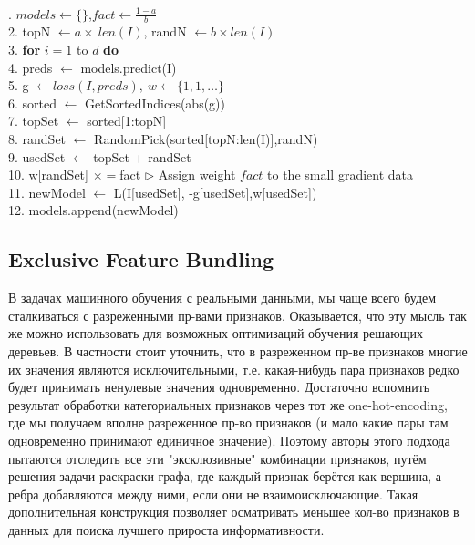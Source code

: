 \documentclass[12pt,fleqn]{article}
\begin{document}
\hline\\ \vspace{10pt}
{\ttfamily
	. $models \leftarrow \{\}$,$fact \leftarrow \frac{1 - a}{b}$\\
	2. topN $\leftarrow a \times~len(I)$, randN $\leftarrow b \times len(I)$\\
	3. \textbf{for} $i = 1$ to $d$ \textbf{do}\\
	4. \hspace{15pt} preds $\leftarrow$ models.predict(I)\\
	5. \hspace{15pt} g $\leftarrow loss(I, preds),~ w \leftarrow \{1,1,\dots\}$\\
	6. \hspace{15pt} sorted $\leftarrow$ GetSortedIndices(abs(g))\\
	7. \hspace{15pt} topSet $\leftarrow$ sorted[1:topN]\\
	8. \hspace{15pt} randSet $\leftarrow$ RandomPick(sorted[topN:len(I)],randN)\\
	9. \hspace{15pt} usedSet $\leftarrow$ topSet + randSet\\
	10.\hspace{15pt} w[randSet] $\times =$fact $\triangleright$ Assign weight $fact$ to the small gradient data\\
	11.\hspace{15pt} newModel $\leftarrow$ L(I[usedSet], -g[usedSet],w[usedSet])\\
	12.\hspace{15pt} models.append(newModel)
}
\vspace{5pt}
\hline
\vspace{5pt}
\subsection{Exclusive Feature Bundling}

В задачах машинного обучения с реальными данными, мы чаще всего будем сталкиваться с разреженными пр-вами признаков. Оказывается, что эту мысль так же можно использовать для возможных оптимизаций обучения решающих деревьев. В частности стоит уточнить, что в разреженном пр-ве признаков многие их значения являются исключительными, т.е. какая-нибудь пара признаков редко будет принимать ненулевые значения одновременно. Достаточно вспомнить результат обработки категориальных признаков через тот же one-hot-encoding, где мы получаем вполне разреженное пр-во признаков (и мало какие пары там одновременно принимают единичное значение). Поэтому авторы этого подхода пытаются отследить все эти "эксклюзивные" комбинации признаков, путём решения задачи раскраски графа, где каждый признак берётся как вершина, а ребра добавляются между ними, если они не взаимоисключающие. Такая дополнительная конструкция позволяет осматривать меньшее кол-во признаков в данных для поиска лучшего прироста информативности.
\end{document}
